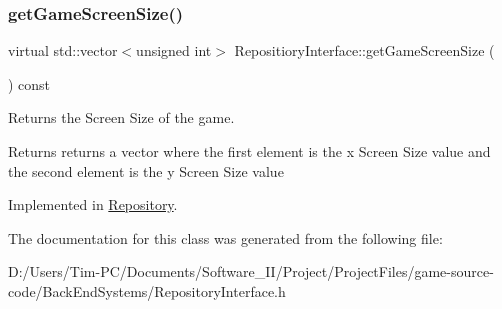 \subsubsection{\texorpdfstring{get\+Game\+Screen\+Size()}{getGameScreenSize()}}
{\footnotesize\ttfamily virtual std\+::vector$<$unsigned int$>$ Repositiory\+Interface\+::get\+Game\+Screen\+Size (\begin{DoxyParamCaption}{ }\end{DoxyParamCaption}) const\hspace{0.3cm}{\ttfamily [pure virtual]}}



Returns the Screen Size of the game. 

\begin{DoxyReturn}{Returns}
returns a vector where the first element is the x Screen Size value and the second element is the y Screen Size value 
\end{DoxyReturn}


Implemented in \hyperlink{class_repository_ab369b3a1d2957b2bd3130c8c348343dd}{Repository}.



The documentation for this class was generated from the following file\+:\begin{DoxyCompactItemize}
\item 
D\+:/\+Users/\+Tim-\/\+P\+C/\+Documents/\+Software\+\_\+\+I\+I/\+Project/\+Project\+Files/game-\/source-\/code/\+Back\+End\+Systems/Repository\+Interface.\+h\end{DoxyCompactItemize}
